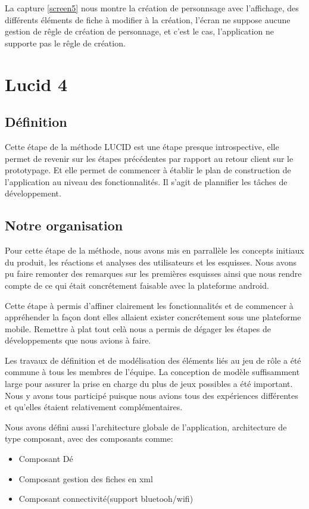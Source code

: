 \documentclass[11pt,a4paper]{article}
\begin{document}
La capture \ref{screen5} nous montre la création de personnsage avec
l'affichage, des différents éléments de fiche à modifier à la création, l'écran
ne suppose aucune gestion de rêgle de création de personnage, et c'est le cas,
l'application ne supporte pas le rêgle de création.

\clearpage
\section{Lucid 4}

\subsection{Définition}

Cette étape de la méthode LUCID est une étape presque introspective, elle permet
de revenir sur les étapes précédentes par rapport au retour client sur le
prototypage. Et elle permet de commencer à établir le plan de construction de
l'application au niveau des fonctionnalités. Il s'agit de plannifier les tâches
de développement.

\subsection{Notre organisation}

Pour cette étape de la méthode, nous avons mis en parrallèle les
concepts initiaux du produit, les réactions et analyses des utilisateurs et les
esquisses. Nous avons pu faire remonter des remarques sur les premières
esquisses ainsi que nous rendre compte de ce qui était concrétement faisable
avec la plateforme android.

Cette étape à permis d'affiner clairement les fonctionnalités et de commencer à
appréhender la façon dont elles allaient exister concrétement sous une
plateforme mobile. Remettre à plat tout celà nous a permis de
dégager les étapes de développements que nous avions à faire.

Les travaux de définition et de modélisation des éléments liés au jeu de rôle a
été commune à tous les membres de l'équipe. La conception de modèle suffisamment
large pour assurer la prise en charge du plus de jeux possibles a été important.
Nous y avons tous participé puisque nous avions tous des expériences différentes
et qu'elles étaient relativement complémentaires.

Nous avons défini aussi l'architecture globale de l'application, architecture de
type composant, avec des composants comme:
\begin{itemize}
  \item Composant Dé
  \item Composant gestion des fiches en xml
  \item Composant connectivité(support bluetooh/wifi)
\end{itemize}
\end{document}
